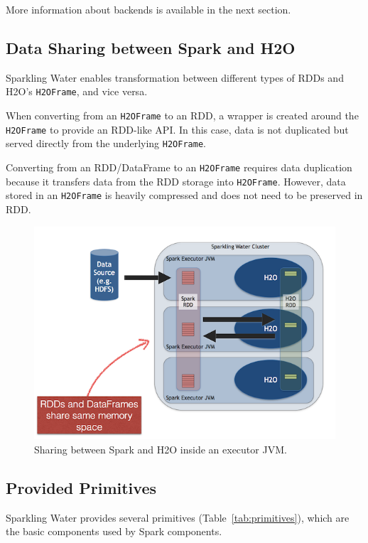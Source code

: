\documentclass{standalone}
\begin{document}
More information about backends is available in the next section.

\subsection{Data Sharing between Spark and H2O}

Sparkling Water enables transformation between different types of RDDs and H2O's \texttt{H2OFrame}, and vice versa.

When converting from an \texttt{H2OFrame} to an RDD, a wrapper is created around the \texttt{H2OFrame} to provide an RDD-like API. In this case,  data is not duplicated but served directly from the underlying \texttt{H2OFrame}.

Converting from an RDD/DataFrame to an \texttt{H2OFrame} requires data duplication because it transfers data from the RDD storage into \texttt{H2OFrame}. However, data stored in an \texttt{H2OFrame} is heavily compressed and does not need to be preserved in RDD.

\begin{figure}[h!]
	\centering
	\includegraphics[scale=1]{sw/images/DataShare.png}
	\caption{Sharing between Spark and H2O inside an executor JVM.}
\end{figure}

\subsection{Provided Primitives}

Sparkling Water provides several primitives (Table~\ref{tab:primitives}), which are the basic components used by Spark components.
\end{document}
